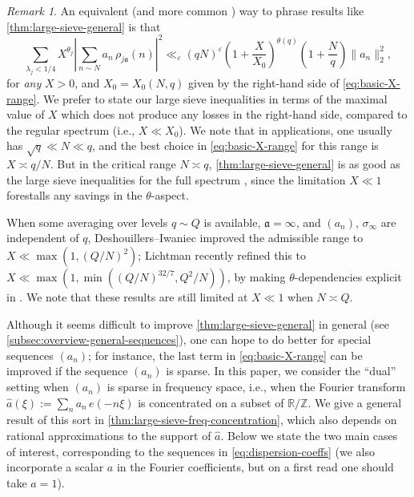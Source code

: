 \documentclass[reqno,11pt]{amsart}
\theoremstyle{remark}
\newtheorem*{remark}{Remark}
\numberwithin{equation}{section}
\newcommand{\Z}{\mathbb{Z}}
\newcommand{\R}{\mathbb{R}}
\newcommand{\ma}{\mathfrak{a}}
\newcommand{\eps}{\varepsilon}
\renewcommand{\hat}{\widehat}
\begin{document}
\begin{remark}
An equivalent (and more common \cite{deshouillers1982kloosterman,drappeau2017sums}) way to phrase results like \cref{thm:large-sieve-general} is that
\[
    \sum_{\lambda_j < 1/4}
    X^{\theta_j} 
    \left\vert 
    \sum_{n \sim N} a_n\, \rho_{j\ma}(n)
    \right\vert^2 
    \ll_\eps 
    (qN)^\eps 
    \left(1 + \frac{X}{X_0}\right)^{\theta(q)}
    \left(1 + \frac{N}{q}\right) \|a_n\|_2^2,
\]
for \emph{any} $X > 0$, and $X_0 = X_0(N, q)$ given by the right-hand side of \cref{eq:basic-X-range}. We prefer to state our large sieve inequalities in terms of the maximal value of $X$ which does not produce any losses in the right-hand side, compared to the regular spectrum (i.e., $X \ll X_0$). We note that in applications, one usually has $\sqrt{q} \ll N \ll q$, and the best choice in \cref{eq:basic-X-range} for this range is $X \asymp q/N$. But in the critical range $N \asymp q$, \cref{thm:large-sieve-general} is as good as the large sieve inequalities for the full spectrum \cite[Theorem 2]{deshouillers1982kloosterman}, since the limitation $X \ll 1$ forestalls any savings in the $\theta$-aspect.

When some averaging over levels $q \sim Q$ is available, $\ma = \infty$, and $(a_n)$, $\sigma_\infty$ are independent of $q$, Deshouillers--Iwaniec \cite[Theorem 6]{deshouillers1982kloosterman} improved the admissible range to $X \ll \max(1, (Q/N)^2)$; Lichtman \cite{lichtman2023primes} recently refined this to $X \ll \max(1, \min((Q/N)^{32/7}, Q^2/N))$, by making $\theta$-dependencies explicit in \cite[\S 8.2]{deshouillers1982kloosterman}. We note that these results are still limited at $X \ll 1$ when $N \asymp Q$.
\end{remark}

Although it seems difficult to improve \cref{thm:large-sieve-general} in general (see \cref{subsec:overview-general-sequences}), one can hope to do better for special sequences $(a_n)$; for instance, the last term in \cref{eq:basic-X-range} can be improved if the sequence $(a_n)$ is sparse. In this paper, we consider the ``dual'' setting when $(a_n)$ is sparse in frequency space, i.e., when the Fourier transform $\hat{a}(\xi) := \sum_n a_n\, e(-n\xi)$ is concentrated on a subset of $\R/\Z$. We give a general result of this sort in \cref{thm:large-sieve-freq-concentration}, which also depends on rational approximations to the support of $\hat{a}$. Below we state the two main cases of interest, corresponding to the sequences in \cref{eq:dispersion-coeffs} (we also incorporate a scalar $a$ in the Fourier coefficients, but on a first read one should take $a = 1$).
\end{document}
